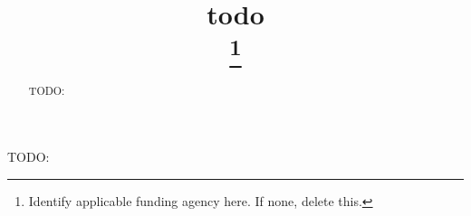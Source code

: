 \documentclass[conference]{IEEEtran}
\newcommand{\todo}[1]{}
\renewcommand{\todo}[1]{{\color{red} TODO: {#1}}}
\begin{document}
\title{todo\\

\thanks{Identify applicable funding agency here. If none, delete this.}
}

\author{
\and
{}
\and
{}
}

\maketitle

\begin{abstract}
\todo{}
\end{abstract}

\begin{IEEEkeywords}
\todo{}
\end{IEEEkeywords}












\vspace{12pt}
\end{document}
